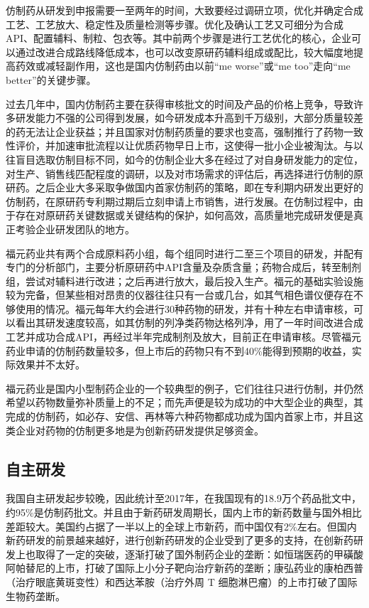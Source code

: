 \documentclass[twocolumn]{ctexbook}
\begin{document}
			仿制药从研发到申报需要一至两年的时间，大致要经过调研立项，优化并确定合成工艺、工艺放大、稳定性及质量检测等步骤\citep{RN22}。优化及确认工艺又可细分为合成API、配置辅料、制粒、包衣等。其中前两个步骤是进行工艺优化的核心，企业可以通过改进合成路线降低成本，也可以改变原研药辅料组成或配比，较大幅度地提高药效或减轻副作用，这也是国内仿制药由以前“me worse”或“me too”走向“me better”的关键步骤\citep{RN12}。
			
			过去几年中，国内仿制药主要在获得审核批文的时间及产品的价格上竞争，导致许多研发能力不强的公司得到发展，如今研发成本升高到千万级别，大部分质量较差的药无法让企业获益；并且国家对仿制药质量的要求也变高，强制推行了药物一致性评价，并加速审批流程以让优质药物早日上市，这使得一批小企业被淘汰。与以往盲目选取仿制目标不同，如今的仿制企业大多在经过了对自身研发能力的定位，对生产、销售线匹配程度的调研，以及对市场需求的评估后，再选择进行仿制的原研药。之后企业大多采取争做国内首家仿制药的策略，即在专利期内研发出更好的仿制药，在原研药专利期过期后立刻申请上市销售，进行发展。在仿制过程中，由于存在对原研药关键数据或关键结构的保护，如何高效，高质量地完成研发便是真正考验企业研发团队的地方。
			
			福元药业共有两个合成原料药小组，每个组同时进行二至三个项目的研发，并配有专门的分析部门，主要分析原研药中API含量及杂质含量；药物合成后，转至制剂组，尝试对辅料进行改进；之后再进行放大，最后投入生产。福元的基础实验设施较为完备，但某些相对昂贵的仪器往往只有一台或几台，如其气相色谱仪便存在不够使用的情况。福元每年大约会进行30种药物的研发，并有十种左右申请审核，可以看出其研发速度较高，如其仿制的列净类药物达格列净，用了一年时间改进合成工艺并成功合成API，再经过半年完成制剂及放大，目前正在申请审核。尽管福元药业申请的仿制药数量较多，但上市后的药物只有不到40\%能得到预期的收益，实际效果并不太好。
			
			福元药业是国内小型制药企业的一个较典型的例子，它们往往只进行仿制，并仍然希望以药物数量弥补质量上的不足；而先声便是较为成功的中大型企业的典型，其完成的仿制药，如必存、安信、再林等六种药物都成功成为国内首家上市，并且这类企业对药物的仿制更多地是为创新药研发提供足够资金。
			
			
			\subsection{自主研发}
			我国自主研发起步较晚，因此统计至2017年，在我国现有的18.9万个药品批文中，约95\%是仿制药批文\citep{RN21}。并且由于新药研发周期长，国内上市的新药数量与国外相比差距较大。美国约占据了一半以上的全球上市新药，而中国仅有2\%左右\citep{RN23}。但国内新药研发的前景越来越好，进行创新药研发的企业受到了更多的支持，在创新药研发上也取得了一定的突破，逐渐打破了国外制药企业的垄断：如恒瑞医药的甲磺酸阿帕替尼的上市，打破了国际上小分子靶向治疗新药的垄断；康弘药业的康柏西普（治疗眼底黄斑变性）和西达苯胺（治疗外周 T 细胞淋巴瘤）的上市打破了国际生物药垄断\citep{RN24}。
			
\end{document}
